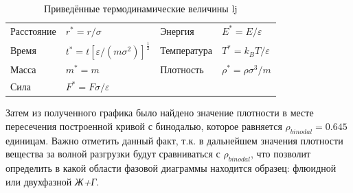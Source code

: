 \begin{table}[h]
    \caption{\label{tab:table1} Приведённые термодинамические величины \acrshort{lj}}
    \begin{ruledtabular}
        \begin{tabular}{ l l l l }
            Расстояние & $r^* = r/\sigma$ & Энергия & $E^* = E/\varepsilon$\\
            Время & $t^* = t[\varepsilon/(m\sigma^2)]^\frac{1}{2}$ & Температура & $T^* = k_BT/\varepsilon$\\
            Масса & $m^* = m$ & Плотность & $\rho^* = \rho\sigma^3/m$\\
            Сила & $F^* = F\sigma/\varepsilon$ & & \\
        \end{tabular}
    \end{ruledtabular}
\end{table}

Затем из полученного графика было найдено значение плотности в месте пересечения построенной кривой с бинодалью, которое равняется $\rho_{binodal}=0.645$ единицам. Важно отметить данный факт, т.к. в дальнейшем значения плотности вещества за волной разгрузки будут сравниваться с $\rho_{binodal}$, что позволит определить в какой области фазовой диаграммы находится образец: флюидной или двухфазной \textit{Ж+Г}.  